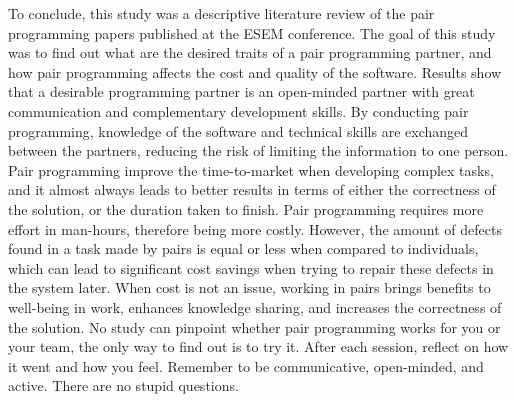 \documentclass[conference]{IEEEtran}
\begin{document}
To conclude, this study was a descriptive literature review of the pair programming papers published at the ESEM conference. The goal of this study was to find out what are the desired traits of a pair programming partner, and how pair programming affects the cost and quality of the software. Results show that a desirable programming partner is an open-minded partner with great communication and complementary development skills. By conducting pair programming, knowledge of the software and technical skills are exchanged between the partners, reducing the risk of limiting the information to one person. Pair programming improve the time-to-market when developing complex tasks, and it almost always leads to better results in terms of either the correctness of the solution, or the duration taken to finish. Pair programming requires more effort in man-hours, therefore being more costly. However, the amount of defects found in a task made by pairs is equal or less when compared to individuals, which can lead to significant cost savings when trying to repair these defects in the system later. When cost is not an issue, working in pairs brings benefits to well-being in work, enhances knowledge sharing, and increases the correctness of the solution. No study can pinpoint whether pair programming works for you or your team, the only way to find out is to try it. After each session, reflect on how it went and how you feel. Remember to be communicative, open-minded, and active. There are no stupid questions.





\end{document}
